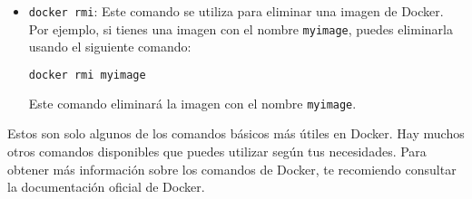 \documentclass{article}
\begin{document}
\begin{itemize}
    \item \lstinline{docker rmi}: Este comando se utiliza para eliminar una imagen de Docker. Por ejemplo, si tienes una imagen con el nombre \lstinline{myimage}, puedes eliminarla usando el siguiente comando:
\begin{lstlisting}[language=bash]
docker rmi myimage\end{lstlisting}
          Este comando eliminará la imagen con el nombre \lstinline{myimage}.
\end{itemize}

Estos son solo algunos de los comandos básicos más útiles en Docker. Hay muchos otros comandos disponibles que puedes utilizar según tus necesidades. Para obtener más información sobre los comandos de Docker, te recomiendo consultar la documentación oficial de Docker.
\end{document}
